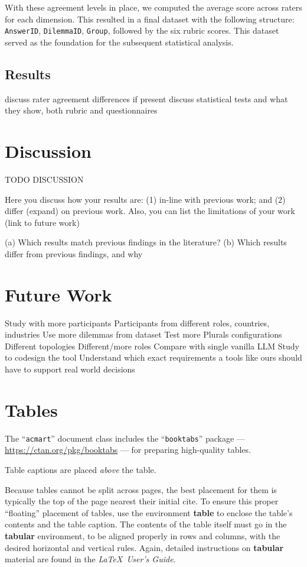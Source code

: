 \documentclass[sigconf, authorversion, nonacm, screen]{acmart}
\begin{document}
With these agreement levels in place, we computed the average score across raters for each dimension. This resulted in a final dataset with the following structure: \texttt{AnswerID}, \texttt{DilemmaID}, \texttt{Group}, followed by the six rubric scores. This dataset served as the foundation for the subsequent statistical analysis.



\subsection{Results}

discuss rater agreement differences if present
discuss statistical tests and what they show, both rubric and questionnaires

\section{Discussion}
TODO DISCUSSION

Here you discuss how your results are: (1) in-line with previous work; and (2) differ
(expand) on previous work. Also, you can list the limitations of your work (link to future work)

(a) Which results match previous findings in the literature?
(b) Which results differ from previous findings, and why

\section{Future Work}

Study with more participants
Participants from different roles, countries, industries
Use more dilemmas from dataset
Test more Plurals configurations
Different topologies
Different/more roles
Compare with single vanilla LLM
Study to codesign the tool
Understand which exact requirements a tools like ours should have to support real world decisions


\section{Tables}

The ``\verb|acmart|'' document class includes the ``\verb|booktabs|''
package --- \url{https://ctan.org/pkg/booktabs} --- for preparing
high-quality tables.

Table captions are placed {\itshape above} the table.

Because tables cannot be split across pages, the best placement for
them is typically the top of the page nearest their initial cite.  To
ensure this proper ``floating'' placement of tables, use the
environment \textbf{table} to enclose the table's contents and the
table caption.  The contents of the table itself must go in the
\textbf{tabular} environment, to be aligned properly in rows and
columns, with the desired horizontal and vertical rules.  Again,
detailed instructions on \textbf{tabular} material are found in the
\textit{\LaTeX\ User's Guide}.
\end{document}
